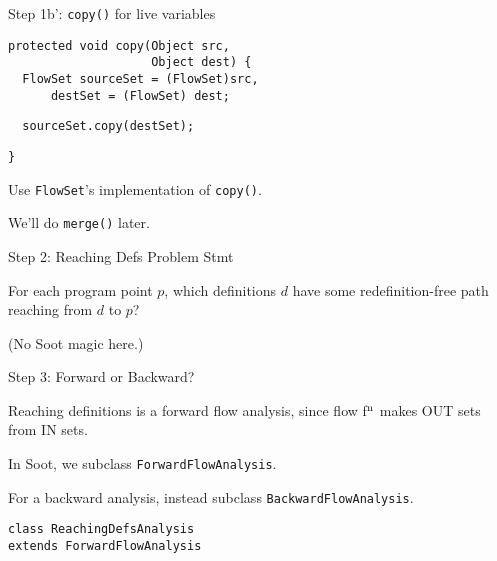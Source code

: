 \begin{slide}{Step 1b': {\tt copy()} for live variables}
\begin{verbatim}
protected void copy(Object src, 
                    Object dest) {
  FlowSet sourceSet = (FlowSet)src,
      destSet = (FlowSet) dest;

\end{verbatim}    
{\green\verb+  sourceSet.copy(destSet);+}
\begin{verbatim}
}
\end{verbatim}

\qquad

Use {\tt FlowSet}'s implementation of {\tt copy()}.

\qquad

We'll do {\tt merge()} later.
\end{slide}

\begin{slide}{Step 2: Reaching Defs Problem Stmt}

For each program point $p$, which definitions $d$ have some
redefinition-free path reaching from $d$ to $p$?

\begin{center}

\end{center}

(No Soot magic here.)

\end{slide}

\begin{slide}{Step 3: Forward or Backward?}

Reaching definitions is a forward flow analysis, since flow f$^{\mbox{\scriptsize n}}$ makes
{\sf OUT} sets from {\sf IN} sets.

\qquad

In Soot, we subclass {\tt \green ForwardFlowAnalysis}.

\qquad

For a backward analysis, instead subclass {\tt BackwardFlowAnalysis}.

\qquad

{\green \tt class ReachingDefsAnalysis \\ \qquad extends ForwardFlowAnalysis}
\end{slide}

